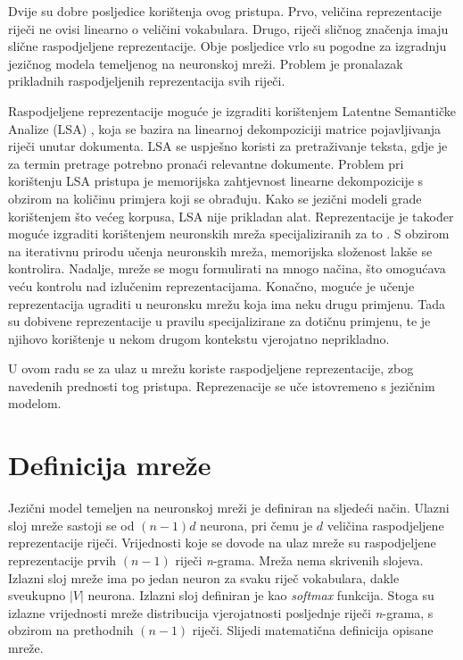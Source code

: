 \documentclass[times, utf8, diplomski, numeric]{fer}
\begin{document}
Dvije su dobre posljedice korištenja ovog pristupa. Prvo, veličina reprezentacije riječi ne ovisi linearno o veličini vokabulara. Drugo, riječi sličnog značenja imaju slične raspodjeljene reprezentacije. Obje posljedice vrlo su pogodne za izgradnju jezičnog modela temeljenog na neuronskoj mreži. Problem je pronalazak prikladnih raspodjeljenih reprezentacija svih riječi.

Raspodjeljene reprezentacije moguće je izgraditi korištenjem Latentne Semantičke Analize (LSA) \cite{Deerwester90indexingby}, koja se bazira na linearnoj dekompoziciji matrice pojavljivanja riječi unutar dokumenta. LSA se uspješno koristi za pretraživanje teksta, gdje je za termin pretrage potrebno pronaći relevantne dokumente. Problem pri korištenju LSA pristupa je memorijska zahtjevnost linearne dekompozicije s obzirom na količinu primjera koji se obrađuju. Kako se jezični modeli grade korištenjem što većeg korpusa, LSA nije prikladan alat. Reprezentacije je također moguće izgraditi korištenjem neuronskih mreža specijaliziranih za to \cite{MikolovSCCD13}. S obzirom na iterativnu prirodu učenja neuronskih mreža, memorijska složenost lakše se kontrolira. Nadalje, mreže se mogu formulirati na mnogo načina, što omogućava veću kontrolu nad izlučenim reprezentacijama. Konačno, moguće je učenje reprezentacija ugraditi u neuronsku mrežu koja ima neku drugu primjenu. Tada su dobivene reprezentacije u pravilu specijalizirane za dotičnu primjenu, te je njihovo korištenje u nekom drugom kontekstu vjerojatno neprikladno.

U ovom radu se za ulaz u mrežu koriste raspodjeljene reprezentacije, zbog navedenih prednosti tog pristupa. Reprezenacije se uče istovremeno s jezičnim modelom.

\section{Definicija mreže}

Jezični model temeljen na neuronskoj mreži je definiran na sljedeći način. Ulazni sloj mreže sastoji se od $(n - 1) d$ neurona, pri čemu je $d$ veličina raspodjeljene reprezentacije riječi. Vrijednosti koje se dovode na ulaz mreže su raspodjeljene reprezentacije prvih $(n - 1)$ riječi \textit{n}-grama. Mreža nema skrivenih slojeva. Izlazni sloj mreže ima po jedan neuron za svaku riječ vokabulara, dakle sveukupno $|V|$ neurona. Izlazni sloj definiran je kao \textit{softmax} funkcija. Stoga su izlazne vrijednosti mreže distribucija vjerojatnosti posljednje riječi \textit{n}-grama, s obzirom na prethodnih $(n - 1)$ riječi. Slijedi matematična definicija opisane mreže.
\end{document}

